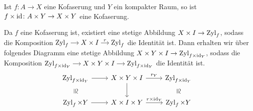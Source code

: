 \begin{satz}
	Ist $f \colon A \to X$ eine Kofaserung und $Y$ ein kompakter Raum, so ist $f \times {\operatorname{id}} \colon A \times Y \to X \times Y$ eine Kofaserung.
\end{satz}
\begin{beweis}
	Da $f$ eine Kofaserung ist, existiert eine stetige Abbildung $X \times I \to \operatorname{Zyl}_f$, sodass die Komposition
	\(
		\begin{tikzcd}[sep=small,cramped]
			\Zyl_f \rar & X \times I \rar["r"] & \Zyl_f
		\end{tikzcd}
	\)
	die Identität ist.
	Dann erhalten wir über folgendes Diagramm eine stetige Abbildung $X \times Y \times I \to\operatorname{Zyl}_{f \times {\operatorname{id}_Y}}$, sodass die Komposition
	\(
		\begin{tikzcd}[sep=small,cramped]
			\Zyl_{f \times {\id_Y}} \rar & X \times Y \times I \rar & \Zyl_{f \times {\id_Y}}
		\end{tikzcd}
	\)
	die Identität ist.
	\[
		\begin{tikzcd}
			\Zyl_{f \times {\id_Y}} \rar \dar[phantom,"\cong",sloped] & X \times Y \times I \rar["r_Y"] \dar  & \Zyl_{f \times {\id_Y}} \dar[phantom,"\cong",sloped] \\
			\Zyl_f \times Y \rar & X \times I \times Y \rar["r \times {\id}_Y"] & \Zyl_f \times Y
		\end{tikzcd}
	\]
\end{beweis}

